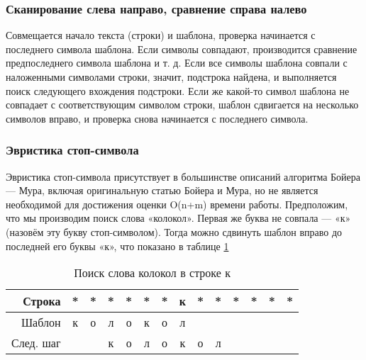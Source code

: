 \documentclass[../main.tex]{subfiles}
\begin{document}
\subsubsection{Сканирование слева направо, сравнение справа налево}

	Совмещается начало текста (строки) и шаблона, проверка начинается с последнего символа шаблона. 
	Если символы совпадают, производится сравнение предпоследнего символа шаблона и т. д. 
	Если все символы шаблона совпали с наложенными символами строки, значит, подстрока найдена, и выполняется поиск следующего вхождения подстроки. 
	Если же какой-то символ шаблона не совпадает с соответствующим символом строки, шаблон сдвигается на несколько символов вправо, и проверка снова начинается с последнего символа.

\subsubsection{Эвристика стоп-символа}

	Эвристика стоп-символа присутствует в большинстве описаний алгоритма Бойера — Мура, включая оригинальную статью Бойера и Мура, но не является необходимой для достижения оценки O(n+m) времени работы. Предположим, что мы производим поиск слова «колокол». Первая же буква не совпала — «к» (назовём эту букву стоп-символом). Тогда можно сдвинуть шаблон вправо до последней его буквы «к», что показано в таблице \ref{tab:analit:2}
	
	\begin{table}[H]
		\caption{Поиск слова колокол в строке к}
		\label{tab:analit:2}
		\begin{tabular}{|r|c|c|c|c|c|c|c|c|c|c|c|c|c|}
			\hline
			Строка &          * &          * &          * &          * &          * &          * &          к &          * &          * &          * &          * &          * &          * \\
			\hline
			Шаблон &          к &          о &          л &          о &          к &          о &          л &            &            &            &            &            &            \\
			\hline
			След. шаг &            &            &          к &          о &          л &          о &          к &          о &          л &            &            &            &            \\
			\hline
		\end{tabular}  
	\end{table}
\end{document}
